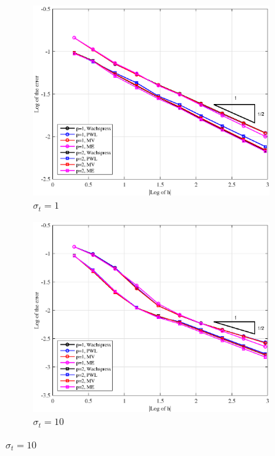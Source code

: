 \begin{figure}
\centering
{
	\begin{subfigure}[b]{0.485\textwidth}
		\centering
		\label{subfig::PA_Left_Poly_sig1}
		\includegraphics[width=\textwidth]{figures/sec_BF/PAErr_Left_Poly_sig1.eps}
	\caption{$\sigma_t = 1$}
	\end{subfigure}
	\hfill
	\begin{subfigure}[b]{0.485\textwidth}
		\centering
		\label{subfig::PA_Left_Poly_sig10}
		\includegraphics[width=\textwidth]{figures/sec_BF/PAErr_Left_Poly_sig10.eps}
	\caption{$\sigma_t = 10$}
	\end{subfigure}
}
\end{figure}
